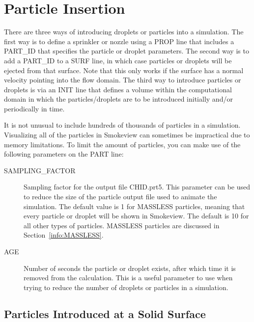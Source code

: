 \documentclass[11pt]{book}
\begin{document}
\section{Particle Insertion}
\label{info:controlling_droplets}

There are three ways of introducing droplets or particles into a simulation. The first way is to define a sprinkler or nozzle using a {\ct PROP} line that includes a {\ct PART\_ID} that specifies the particle or droplet parameters. The second way is to add a {\ct PART\_ID} to a {\ct SURF} line, in which case particles or droplets will be ejected from that surface. Note that this only works if the surface has a normal velocity pointing into the flow domain. The third way to introduce particles or droplets is via an {\ct INIT} line that defines a volume within the computational domain in which the particles/droplets are to be introduced initially and/or periodically in time.

It is not unusual to include hundreds of thousands of particles in a simulation. Visualizing all of the particles in Smokeview can sometimes be impractical due to memory limitations. To limit the amount of particles, you can make use of the following parameters on the {\ct PART} line:
\begin{description}
\item[{\ct SAMPLING\_FACTOR}] Sampling factor for the output file {\ct CHID.prt5}. This parameter can be used to reduce the size of the particle output file used to animate the simulation. The default value is 1 for {\ct MASSLESS} particles, meaning that every particle or droplet will be shown in Smokeview. The default is 10 for all other types of particles. {\ct MASSLESS} particles are discussed in Section~\ref{info:MASSLESS}.
\item[{\ct AGE}]  Number of seconds the particle or droplet exists, after which time it is removed from the calculation. This is a useful parameter to use when trying to reduce the number of droplets or particles in a simulation.
\end{description}



\subsection{Particles Introduced at a Solid Surface}
\label{info:particle_flux}
\end{document}
